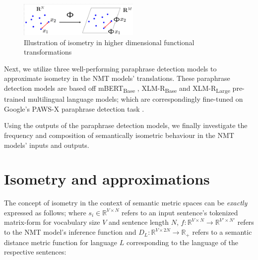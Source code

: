 \documentclass[11pt,a4paper]{article}
\begin{document}
\begin{figure}
  \centering
  \includegraphics[trim={1.0cm 0cm 0cm 1.0cm},clip,width=0.52\textwidth]{isometry_visualized.png}
  \caption{Illustration of isometry in higher dimensional functional transformations \citep{Hegde-Numax}}
  \label{isometry_visual}
\end{figure}

Next, we utilize three well-performing paraphrase detection models to approximate isometry in the NMT models' translations. These paraphrase detection models are based off mBERT\textsubscript{Base} \cite{devlin2018bert}, XLM-R\textsubscript{Base} and XLM-R\textsubscript{Large} \cite{conneau2019unsupervised} pre-trained multilingual language models; which are correspondingly fine-tuned on Google's PAWS-X paraphrase detection task \cite{pawsx2019emnlp, hu2020xtreme}.
 
Using the outputs of the paraphrase detection models, we finally investigate the frequency and composition of semantically isometric behaviour in the NMT models' inputs and outputs.


\section{Isometry and approximations}

The concept of isometry in the context of semantic metric spaces can be \textit{exactly} expressed as follows; where $s_i \in \mathbb{R}^{V \times N}$ refers to an input sentence's tokenized matrix-form for vocabulary size $V$ and sentence length $N$, $f: \mathbb{R}^{V \times N} \to \mathbb{R}^{V' \times N'}$ refers to the NMT model's inference function and $D_L: \mathbb{R}^{V \times 2N} \to \mathbb{R}_+$ refers to a semantic distance metric function for language $L$ corresponding to the language of the respective sentences:
\end{document}
